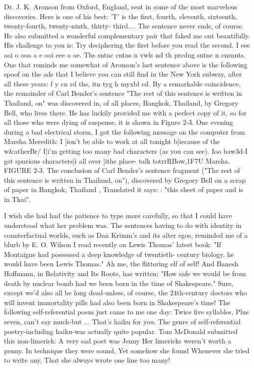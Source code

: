 Dr. J. K. Aronson from Oxford, England, sent in some of the most marvelous discoveries. Here is one of his best: 
'T' is the first, fourth, eleventh, sixteenth, twenty-fourth, twenty-ninth, thirty- third.... 
The sentence never ends, of course. He also submitted a wonderful complementary pair that faked me out beautifully. His challenge to you is: Try deciphering the first before you read the second. 
I eee oai o ooa a e ooi eee o oe. 
Ths sntnc cntns n vwls nd th prcdng sntnc n cnsnnts. 
One that reminds me somewhat of Aronson's last sentence above is the following spoof on the ads that I believe you can still find in the New York subway, after all these years: 
f y cn rd ths, itn tyg h myxbl cd. 
By a remarkable coincidence, the remainder of Carl Bender's sentence "The rest of this sentence is written in Thailand, on" was discovered in, of all places, Bangkok, Thailand, by Gregory Bell, who lives there. He has luckily provided me with a perfect copy of it, so for all those who were dying of suspense, it is shown in Figure 2-3. One evening during a bad electrical storm, I got the following message on the computer from Marsha Meredith: 
I ]ion't be able to work at all tonight b]iecause of the w&atherBr/ I]i'm getting too many bad characters (as you can see). Ioo baw3d-I get spurious characters]i all over ]ithe place- talk totrrRBow,1F7U Marsha. 
FIGURE 2-3. The conclusion of Carl Bender's sentence fragment ("The rest of this sentence is written in Thailand, on"), discovered by Gregory Bell on a scrap of paper in Bangkok, Thailand , Translated it says: : "this sheet of paper and is in Thai". 



I wish she had had the patience to type more carefully, so that I could have understood what her problem was. The sentences having to do with identity in counterfactual worlds, such as Dan Krimm's and its alter egos, reminded me of a blurb by E. O. Wilson I read recently on Lewis Thomas' latest book: "If Montaigne had possessed a deep knowledge of twentieth- century biology, he would have been Lewis Thomas." Ah me, the flittering elf of self! And Banesh Hoffmann, in Relativity and Its Roots, has written: "How safe we would be from death by nuclear bomb had we been born in the time of Shakespeare." Sure, except we'd also all be long dead-unless, of course, the 24th-century doctors who will invent immortality pills had also been born in Shakespeare's time! The following self-referential poem just came to me one day: 
Twice five syllables, Plus seven, can't say much-but ... That's haiku for you. 
The genre of self-referential poetry-including haiku-was actually quite popular. Tom McDonald submitted this non-limerick: 
A very sad poet was Jenny Her limericks weren't worth a penny. In technique they were sound, Yet somehow she found Whenever she tried to write any, That she always wrote one line too many! 

